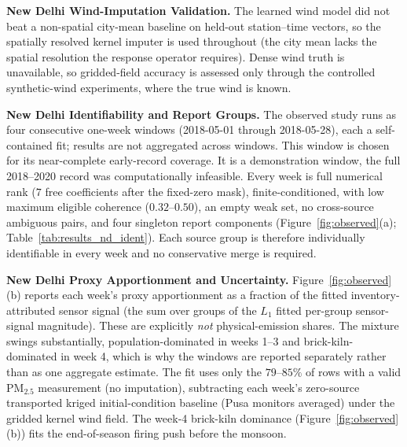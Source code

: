 \noindent\textbf{New Delhi Wind-Imputation Validation.}
\label{subsec:results_wind_imputation}
The learned wind model did not beat a non-spatial city-mean baseline on held-out
station--time vectors, so the spatially resolved kernel imputer is used throughout (the city mean lacks the
spatial resolution the response operator requires).  Dense wind truth is
unavailable, so gridded-field accuracy is assessed only through the controlled
synthetic-wind experiments, where the true wind is known.

\noindent\textbf{New Delhi Identifiability and Report Groups.}
\label{subsec:results_new_delhi_identifiability}
The observed study runs as four consecutive one-week windows (2018-05-01 through
2018-05-28), each a self-contained fit; results are not aggregated across windows. This window is chosen for its near-complete early-record coverage. It is a
demonstration window, the full 2018--2020 record was computationally infeasible.  Every week is full numerical rank ($7$ free coefficients after
the fixed-zero mask), finite-conditioned, with low maximum eligible coherence
($0.32$--$0.50$), an empty weak set, no cross-source ambiguous pairs, and four
singleton report components (Figure~\ref{fig:observed}(a);
Table~\ref{tab:results_nd_ident}).  Each source group is therefore individually
identifiable in every week and no conservative merge is required.


\noindent\textbf{New Delhi Proxy Apportionment and Uncertainty.}
\label{subsec:results_new_delhi_apportionment}
Figure~\ref{fig:observed}(b) reports each week's proxy apportionment as a
fraction of the fitted inventory-attributed sensor signal (the sum over groups of
the $L_1$ fitted per-group sensor-signal magnitude).  These are explicitly \emph{not}
physical-emission shares.  The mixture swings substantially, population-dominated in
weeks 1--3 and brick-kiln-dominated in week 4, which is why the windows are
reported separately rather than as one aggregate estimate.  The fit uses only the
$79$--$85\%$ of rows with a valid PM$_{2.5}$ measurement (no imputation), subtracting
each week's zero-source transported kriged initial-condition baseline (Pusa monitors
averaged) under the gridded kernel wind field. 
The week-4 brick-kiln
dominance (Figure~\ref{fig:observed}(b)) fits the end-of-season firing push before
the monsoon.
